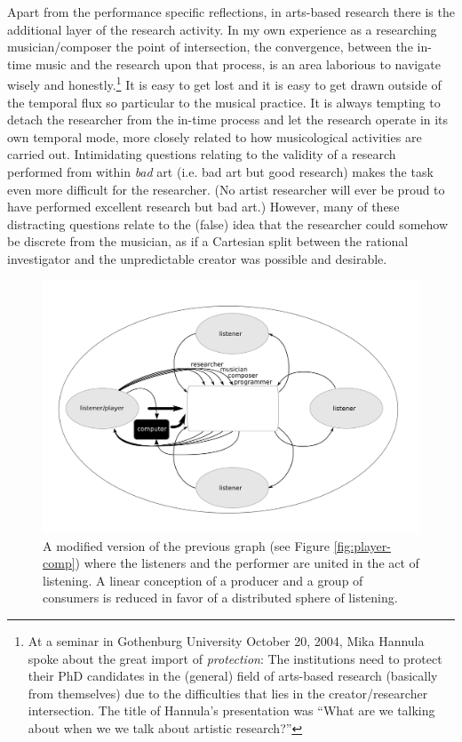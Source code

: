 Apart from the performance specific reflections, in arts-based research there is the additional layer of the research activity. In my own experience as a researching musician/composer the point of intersection, the convergence, between the in-time music and the research upon that process, is an area laborious to navigate wisely and honestly.\footnote{At a seminar in Gothenburg University October 20, 2004, Mika Hannula spoke about the great import of \emph{protection}: The institutions need to protect their PhD candidates in the (general) field of arts-based research (basically from themselves) due to the difficulties that lies in the creator/researcher intersection. The title of Hannula's presentation was ``What are we talking about when we we talk about artistic research?''} It is easy to get lost and it is easy to get drawn outside of the temporal flux so particular to the musical practice. It is always tempting to detach the researcher from the in-time process and let the research operate in its own temporal mode, more closely related to how musicological activities are carried out. Intimidating questions relating to the validity of a research performed from within \emph{bad} art (i.e. bad art but good research) makes the task even more difficult for the researcher. (No artist researcher will ever be proud to have performed excellent research but bad art.) However, many of these distracting questions relate to the (false) idea that the researcher could somehow be discrete from the musician, as if a Cartesian split between the rational investigator and the unpredictable creator was possible and desirable. 

\begin{figure}[htb]
  \centering
  \includegraphics[width=\linewidth]{img/player-listener-computer}
  \caption{\small{A modified version of the previous graph (see Figure \ref{fig:player-comp}) where the listeners and the performer are united in the act of listening. A linear conception of a producer and a group of consumers is reduced in favor of a distributed sphere of listening.}}
  \label{fig:player-comp-2}
\end{figure}

